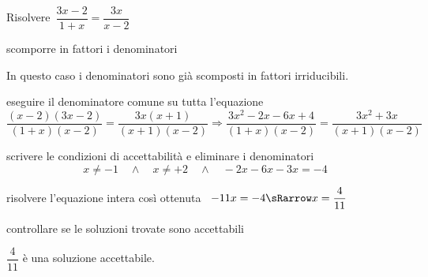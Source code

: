  \begin{esempio}
Risolvere~\(\dfrac{3x-2}{1+x}=\dfrac{3x}{x-2}\)
 
\begin{enumerate*}
\item scomporre in fattori i denominatori

In questo caso i denominatori sono già scomposti in fattori irriducibili.

\item eseguire il denominatore comune su tutta l'equazione
\[\frac{(x-2)(3x-2)}{(1+x)(x-2)}=\frac{3x(x+1)}{(x+1)(x-2)}\Rightarrow
\frac{3x^{2}-2x-6x+4}{(1+x)(x-2)}=\frac{3x^2+3x}{(x+1)(x-2)}\]

\item scrivere le condizioni di accettabilità e eliminare i denominatori
\[x \neq -1 \quad \wedge \quad x \neq +2 \quad \wedge \quad 
-2x -6x -3x = -4\]
\item risolvere l'equazione intera così ottenuta~
\(-11x = -4 \sRarrow x=\dfrac{4}{11}\)

\item controllare se le soluzioni trovate sono accettabili

\centering \(\dfrac{4}{11}\) è una soluzione accettabile.

\end{enumerate*}
 \end{esempio}

